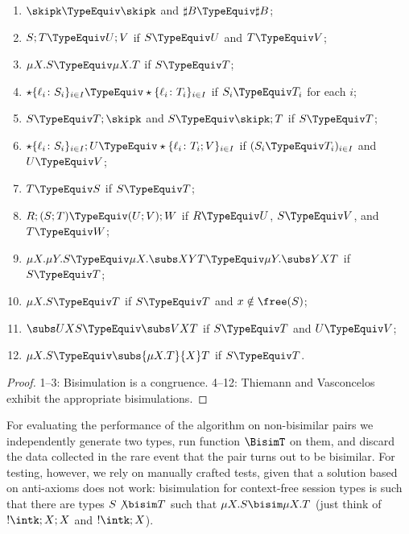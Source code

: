 \begin{theorem}
\label{thm:axioms}
{\small  \begin{enumerate}[leftmargin=*]
  \item $\skipk \TypeEquiv \skipk$ and $\sharp B \TypeEquiv \sharp B$;
  \item $S;T \TypeEquiv U;V$ if $S \TypeEquiv U$ and $T \TypeEquiv V$;
  \item $\mu X.S \TypeEquiv \mu X.T$ if $S \TypeEquiv T$;
  \item $\star\{\ell_i\colon S_i\}_{i\in I}\TypeEquiv
    \star\{\ell_i\colon T_i\}_{i\in I}$ if $S_i \TypeEquiv T_i$ for each $i$;
  \item $S\TypeEquiv T;\skipk$ and $S\TypeEquiv \skipk;T$ if $S \TypeEquiv T$;
  \item $\star\{\ell_i\colon S_i\}_{i\in I};U\TypeEquiv
    \star\{\ell_i\colon T_i;V\}_{i\in I}$ if $(S_i \TypeEquiv T_i)_{i\in
      I}$ and $U \TypeEquiv V$;
  \item $T \TypeEquiv S$ if $S \TypeEquiv T$;
  \item $R;(S;T) \TypeEquiv (U;V);W$ if $R \TypeEquiv U$, $S \TypeEquiv V$, and $T\TypeEquiv W$;
  \item
    $\mu X.\mu Y.S \TypeEquiv \mu X.\subs XYT \TypeEquiv \mu Y.\subs
    YXT$ if $S \TypeEquiv T$;
  \item $\mu X.S \TypeEquiv T$ if $S \TypeEquiv T$ and $x\notin\free(S)$;
  \item $\subs UXS\TypeEquiv \subs VXT$  if $S \TypeEquiv T$ and $U \TypeEquiv V$;
  \item $\mu X.S \TypeEquiv \subs{\mu X.T}{X}T$ if $S \TypeEquiv T$.
  \end{enumerate}}
\end{theorem}
%
\begin{proof}
  1--3: Bisimulation is a congruence. 4--12: Thiemann and
  Vasconcelos~\cite{thiemann2016context} exhibit the appropriate
  bisimulations.
\end{proof}

For evaluating the performance of the algorithm on non-bisimilar 
pairs we independently
generate two types, run function $\BisimT$ on them, and discard the
data collected in the rare event that the pair turns out to be
bisimilar.
%
For testing, however, we rely on manually crafted tests, given that a
solution based on anti-axioms does not work: bisimulation for
context-free session types is such that there are types
$S \not\bisim T$ such that $\mu X.S \bisim \mu X.T$ (just think of
$!\intk;X;X$ and $!\intk;X$).

